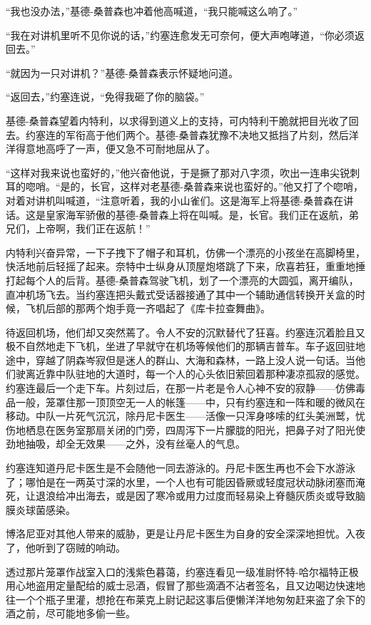     “我也没办法，”基德-桑普森也冲着他高喊道，“我只能喊这么响了。”

    “我在对讲机里听不见你说的话，”约塞连愈发无可奈何，便大声咆哮道，“你必须返回去。”

    “就因为一只对讲机？”基德-桑普森表示怀疑地问道。

    “返回去，”约塞连说，“免得我砸了你的脑袋。”

    基德-桑普森望着内特利，以求得到道义上的支持，可内特利干脆就把目光收了回去。约塞连的军衔高于他们两个。基德-桑普森犹豫不决地又抵挡了片刻，然后洋洋得意地高呼了一声，便又急不可耐地屈从了。

    “这样对我来说也蛮好的，”他兴奋他说，于是撅了那对八字须，吹出一连串尖锐刺耳的唿哨。“是的，长官，这样对老基德-桑普森来说也蛮好的。”他又打了个唿哨，对着对讲机叫喊道，“注意听着，我的小山雀们。这是海军上将基德-桑普森在讲话。这是皇家海军骄傲的基德-桑普森上将在叫喊。是，长官。我们正在返航，弟兄们，上帝啊，我们正在返航！”

 


    内特利兴奋异常，一下子拽下了帽子和耳机，仿佛一个漂亮的小孩坐在高脚椅里，快活地前后轻摇了起来。奈特中士纵身从顶屋炮塔跳了下来，欣喜若狂，重重地捶打起每个人的后背。基德-桑普森驾驶飞机，划了一个漂亮的大圆弧，离开编队，直冲机场飞去。当约塞连把头戴式受话器接通了其中一个辅助通信转换开关盒的时候，飞机后部的那两个炮手竟一齐唱起了《库卡拉查舞曲》。

    待返回机场，他们却又突然蔫了。令人不安的沉默替代了狂喜。约塞连沉着脸且又极不自然地走下飞机，坐进了早就守在机场等候他们的那辆吉普车。车子返回驻地途中，穿越了阴森岑寂但是迷人的群山、大海和森林，一路上没人说一句话。当他们驶离近靠中队驻地的大道时，每一个人的心头依旧萦回着那种凄凉孤寂的感觉。约塞连最后一个走下车。片刻过后，在那一片老是令人心神不安的寂静——仿佛毒品一般，笼罩住那一顶顶空无一人的帐篷——中，只有约塞连和一阵和暖的微风在移动。中队一片死气沉沉，除丹尼卡医生——活像一只浑身哆嗦的红头美洲鹫，忧伤地栖息在医务室那扇关闭的门旁，四周泻下一片朦胧的阳光，把鼻子对了阳光使劲地抽吸，却全无效果——之外，没有丝毫人的气息。

 


    约塞连知道丹尼卡医生是不会随他一同去游泳的。丹尼卡医生再也不会下水游泳了；哪怕是在一两英寸深的水里，一个人也有可能因昏厥或轻度冠状动脉闭塞而淹死，让退浪给冲出海去，或是因了寒冷或用力过度而轻易染上脊髓灰质炎或导致脑膜炎球菌感染。

    博洛尼亚对其他人带来的威胁，更是让丹尼卡医生为自身的安全深深地担忧。入夜了，他听到了窃贼的响动。

    透过那片笼罩作战室入口的浅紫色暮蔼，约塞连看见一级准尉怀特-哈尔福特正极用心地盗用定量配给的威士忌酒，假冒了那些滴酒不沾者签名，且又边喝边快速地往一个个瓶子里灌，想抢在布莱克上尉记起这事后便懒洋洋地匆匆赶来盗了余下的酒之前，尽可能地多偷一些。

